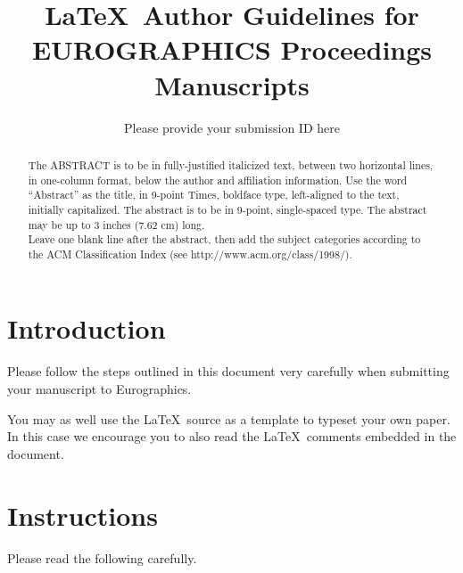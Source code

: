 \documentclass{egpubl-eurovis-short}
\title[EG \LaTeX\ Author Guidelines]%
      {\LaTeX\ Author Guidelines for EUROGRAPHICS Proceedings Manuscripts}
\author[submission ID]{Please provide your submission ID here}
\begin{document}

\maketitle

\begin{abstract}
   The ABSTRACT is to be in fully-justified italicized text, 
   between two horizontal lines,
   in one-column format, 
   below the author and affiliation information. 
   Use the word ``Abstract'' as the title, in 9-point Times, boldface type, 
   left-aligned to the text, initially capitalized. 
   The abstract is to be in 9-point, single-spaced type.
   The abstract may be up to 3 inches (7.62 cm) long. \\
   Leave one blank line after the abstract, 
   then add the subject categories according to the ACM Classification Index 
   (see http://www.acm.org/class/1998/).

\begin{classification} %
\end{classification}

\end{abstract}





\section{Introduction}

Please follow the steps outlined in this document very carefully when
submitting your manuscript to Eurographics.

You may as well use the \LaTeX\ source as a template to typeset your own
paper. In this case we encourage you to also read the \LaTeX\ comments
embedded in the document.

\section{Instructions}

Please read the following carefully.
\end{document}
